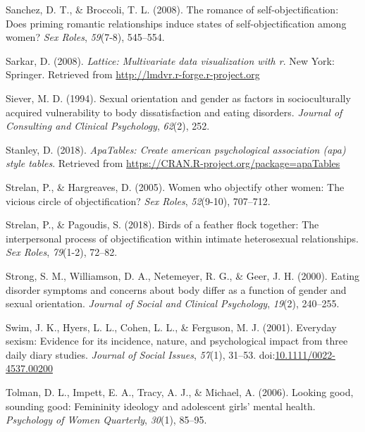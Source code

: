 \documentclass[
  man]{apa6}
\begin{document}
\leavevmode\hypertarget{ref-sanchez2008romance}{}%
Sanchez, D. T., \& Broccoli, T. L. (2008). The romance of self-objectification: Does priming romantic relationships induce states of self-objectification among women? \emph{Sex Roles}, \emph{59}(7-8), 545--554.

\leavevmode\hypertarget{ref-R-lattice}{}%
Sarkar, D. (2008). \emph{Lattice: Multivariate data visualization with r}. New York: Springer. Retrieved from \url{http://lmdvr.r-forge.r-project.org}

\leavevmode\hypertarget{ref-siever1994sexual}{}%
Siever, M. D. (1994). Sexual orientation and gender as factors in socioculturally acquired vulnerability to body dissatisfaction and eating disorders. \emph{Journal of Consulting and Clinical Psychology}, \emph{62}(2), 252.

\leavevmode\hypertarget{ref-R-apaTables}{}%
Stanley, D. (2018). \emph{ApaTables: Create american psychological association (apa) style tables}. Retrieved from \url{https://CRAN.R-project.org/package=apaTables}

\leavevmode\hypertarget{ref-strelan2005women}{}%
Strelan, P., \& Hargreaves, D. (2005). Women who objectify other women: The vicious circle of objectification? \emph{Sex Roles}, \emph{52}(9-10), 707--712.

\leavevmode\hypertarget{ref-strelan2018birds}{}%
Strelan, P., \& Pagoudis, S. (2018). Birds of a feather flock together: The interpersonal process of objectification within intimate heterosexual relationships. \emph{Sex Roles}, \emph{79}(1-2), 72--82.

\leavevmode\hypertarget{ref-strong2000eating}{}%
Strong, S. M., Williamson, D. A., Netemeyer, R. G., \& Geer, J. H. (2000). Eating disorder symptoms and concerns about body differ as a function of gender and sexual orientation. \emph{Journal of Social and Clinical Psychology}, \emph{19}(2), 240--255.

\leavevmode\hypertarget{ref-swimetal}{}%
Swim, J. K., Hyers, L. L., Cohen, L. L., \& Ferguson, M. J. (2001). Everyday sexism: Evidence for its incidence, nature, and psychological impact from three daily diary studies. \emph{Journal of Social Issues}, \emph{57}(1), 31--53. doi:\href{https://doi.org/10.1111/0022-4537.00200}{10.1111/0022-4537.00200}

\leavevmode\hypertarget{ref-tolman2006looking}{}%
Tolman, D. L., Impett, E. A., Tracy, A. J., \& Michael, A. (2006). Looking good, sounding good: Femininity ideology and adolescent girls' mental health. \emph{Psychology of Women Quarterly}, \emph{30}(1), 85--95.
\end{document}
